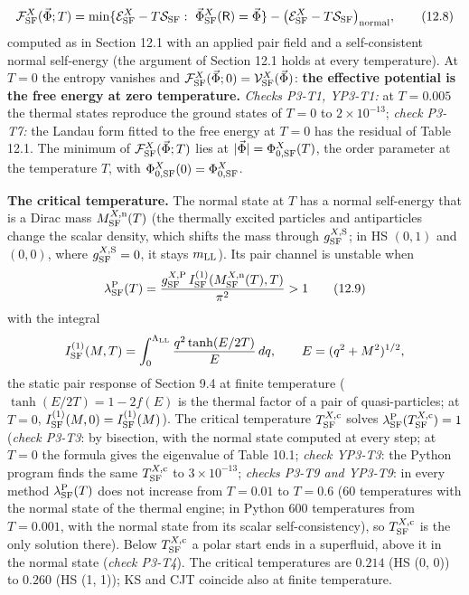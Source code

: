\documentclass[
  10pt,
]{article}
\begin{document}
\[\mathcal F^X_{\rm SF}(\vec\Phi;T)=\min\{\mathcal E^X_{\rm SF}-T\mathcal S_{\rm SF}:\ \vec\Phi^X_{\rm SF}(\mathsf R)=\vec\Phi\}-\big(\mathcal E^X_{\rm SF}-T\mathcal S_{\rm SF}\big)_{\rm normal},\tag{12.8}\]
computed as in Section 12.1 with an applied pair field and a
self-consistent normal self-energy (the argument of Section 12.1 holds
at every temperature). At \(T=0\) the entropy vanishes and
\(\mathcal F^X_{\rm SF}(\vec\Phi;0)=\mathcal V^X_{\rm SF}(\vec\Phi)\):
\textbf{the effective potential is the free energy at zero temperature.}
\emph{Checks P3-T1, YP3-T1:} at \(T=0.005\) the thermal states reproduce
the ground states of \(T=0\) to \(2\times10^{-13}\); \emph{check P3-T7:}
the Landau form fitted to the free energy at \(T=0\) has the residual of
Table 12.1. The minimum of \(\mathcal F^X_{\rm SF}(\vec\Phi;T)\) lies at
\(\lvert\vec\Phi\rvert=\Phi^X_{0,{\rm SF}}(T)\), the order parameter at
the temperature \(T\), with
\(\Phi^X_{0,{\rm SF}}(0)=\Phi^X_{0,{\rm SF}}\).

\textbf{The critical temperature.} The normal state at \(T\) has a
normal self-energy that is a Dirac mass \(M^{X,{\rm n}}_{\rm SF}(T)\)
(the thermally excited particles and antiparticles change the scalar
density, which shifts the mass through \(g^{X,{\rm S}}_{\rm SF}\); in HS
\((0,1)\) and \((0,0)\), where \(g^{X,{\rm S}}_{\rm SF}=0\), it stays
\(m_{\rm LL}\)). Its pair channel is unstable when
\[\lambda^{\rm P}_{\rm SF}(T)=\frac{g^{X,{\rm P}}_{\rm SF}\,I^{(1)}_{\rm SF}(M^{X,{\rm n}}_{\rm SF}(T),T)}{\pi^2}>1\tag{12.9}\]
with the integral
\[I^{(1)}_{\rm SF}(M,T)=\int_0^{\Lambda_{\rm LL}}\frac{q^2\tanh(E/2T)}{E}\,dq,\qquad E=(q^2+M^2)^{1/2},\]
the static pair response of Section 9.4 at finite temperature
(\(\tanh(E/2T)=1-2f(E)\) is the thermal factor of a pair of
quasi-particles; at \(T=0\),
\(I^{(1)}_{\rm SF}(M,0)=I^{(1)}_{\rm SF}(M)\)). The critical temperature
\(T^{X,{\rm c}}_{\rm SF}\) solves
\(\lambda^{\rm P}_{\rm SF}(T^{X,{\rm c}}_{\rm SF})=1\) (\emph{check
P3-T3}: by bisection, with the normal state computed at every step; at
\(T=0\) the formula gives the eigenvalue of Table 10.1; \emph{check
YP3-T3}: the Python program finds the same \(T^{X,{\rm c}}_{\rm SF}\) to
\(3\times10^{-13}\); \emph{checks P3-T9 and YP3-T9}: in every method
\(\lambda^{\rm P}_{\rm SF}(T)\) does not increase from \(T=0.01\) to
\(T=0.6\) (60 temperatures with the normal state of the thermal engine;
in Python 600 temperatures from \(T=0.001\), with the normal state from
its scalar self-consistency), so \(T^{X,{\rm c}}_{\rm SF}\) is the only
solution there). Below \(T^{X,{\rm c}}_{\rm SF}\) a polar start ends in
a superfluid, above it in the normal state (\emph{check P3-T4}). The
critical temperatures are \(0.214\) (HS (0, 0)) to \(0.260\) (HS (1,
1)); KS and CJT coincide also at finite temperature.
\end{document}
